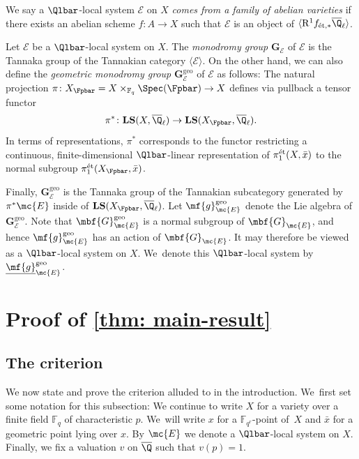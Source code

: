 \begin{defn}\label{defn: come-from-av}
We say a $\Qlbar$-local system $\mathcal{E}$ on $X$ \emph{comes from a family of abelian varieties} if there exists an abelian scheme $f\colon A\to X$ such that $\mathcal{E}$ is an object of $\langle\mathrm{R}^1f_{\textnormal{ét},\ast}\overline{\Q}_\ell\rangle$.
\end{defn}

Let $\mathcal{E}$ be a $\Qlbar$-local system on $X$. The \emph{monodromy group} $\mathbf{G}_\mathcal{E}$ of $\mathcal{E}$ is the Tannaka group of the Tannakian category $\langle\mathcal{E}\rangle$. On the other hand, we can also define the \emph{geometric monodromy group} $\mathbf{G}_\mathcal{E}^\mathrm{geo}$ of $\mathcal{E}$ as follows: The natural projection $\pi\colon X_{\Fpbar}=X\times_{\mathbb{F}_q}\Spec(\Fpbar)\to X$ defines via pullback a tensor functor
\[
\pi^\ast\colon\mathbf{LS}(X,\overline{\Q}_\ell)\to\mathbf{LS}(X_\Fpbar,\overline{\Q}_\ell).
\]
In terms of representations, $\pi^\ast$ corresponds to the functor restricting a continuous, finite-dimensional $\Qlbar$-linear representation of $\pi_1^\textnormal{ét}(X,\bar x)$ to the normal subgroup $\pi_1^\textnormal{ét}(X_\Fpbar,\bar x)$.

Finally, $\mathbf{G}_\mathcal{E}^\mathrm{geo}$ is the Tannaka group of the Tannakian subcategory generated by~$\pi^\ast\mc{E}$ inside of $\mathbf{LS}(X_\Fpbar,\overline{\Q}_\ell)$. Let $\mf{g}^{\mathrm{geo}}_{\mc{E}}$ denote the Lie algebra of $\mathbf{G}_\mathcal{E}^\mathrm{geo}$. Note that $\mbf{G}^{\mathrm{geo}}_{\mc{E}}$ is a normal subgroup of $\mbf{G}_{\mc{E}}$, and hence $\mf{g}^{\mathrm{geo}}_{\mc{E}}$ has an action of $\mbf{G}_{\mc{E}}$. It may therefore be viewed as a $\Qlbar$-local system on $X$. We~denote this $\Qlbar$-local system by $\underline{\mf{g}}^{\mathrm{geo}}_{\mc{E}}$.

\section{Proof of \texorpdfstring{\cref{thm: main-result}}{the result}}\label{sec: proof}

\subsection{The criterion}\label{sec: criterion} 
We now state and prove the criterion alluded to in the introduction. We~first set some notation for this subsection: We continue to write $X$ for a variety over a finite field $\mathbb{F}_q$ of characteristic $p$. We~will write $x$ for a $\mathbb{F}_{q^r}$-point of~$X$ and $\bar x$ for a geometric point lying over $x$. By $\mc{E}$ we denote a $\Qlbar$-local system on $X$. Finally, we fix a valuation $v$ on $\overline{\Q}$ such that $v(p)=1$.

